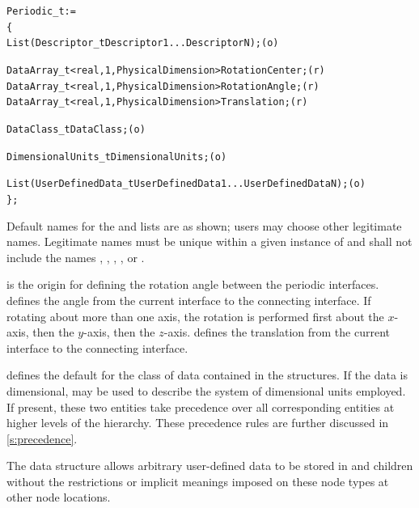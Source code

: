 \begin{alltt}
  Periodic\_t :=
    \{
    List( Descriptor\_t Descriptor1 ... DescriptorN ) ;                      (o)

    DataArray\_t<real, 1, PhysicalDimension> RotationCenter ;                (r)
    DataArray\_t<real, 1, PhysicalDimension> RotationAngle ;                 (r)
    DataArray\_t<real, 1, PhysicalDimension> Translation ;                   (r)

    DataClass\_t DataClass ;                                                 (o)

    DimensionalUnits\_t DimensionalUnits ;                                   (o)

    List( UserDefinedData\_t UserDefinedData1 ... UserDefinedDataN ) ;       (o)
    \} ;
\end{alltt}

\begin{notes}
\item
 Default names for the  and
  lists are as shown; users may choose other
 legitimate names.
 Legitimate names must be unique within a given instance of
  and shall not include the names ,
 , , ,
 or .
\end{notes}

 is the origin for defining the rotation angle
between the periodic interfaces.
 defines the angle from the current interface to
the connecting interface.
If rotating about more than one axis, the rotation is performed first
about the $x$-axis, then the $y$-axis, then the $z$-axis.
 defines the translation from the current interface
to the connecting interface.

 defines the default for the class of data contained in
the  structures.
If the data is dimensional,  may be used to
describe the system of dimensional units employed.
If present, these two entities take precedence over all corresponding
entities at higher levels of the hierarchy.
These precedence rules are further discussed in \autoref{s:precedence}.

The  data structure allows arbitrary
user-defined data to be stored in  and
 children without the restrictions or implicit
meanings imposed on these node types at other node locations.

